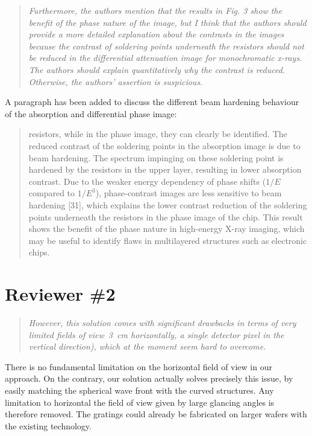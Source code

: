 \documentclass[a4paper,english]{scrartcl}
\newenvironment{reviewerquote}{\begin{quote}\itshape}{\end{quote}}
\begin{document}
\begin{reviewerquote}
    Furthermore, the authors mention that the results in Fig. 3 show the benefit of the phase nature of the image, but I think that the authors should provide a more detailed explanation about the contrasts in the images because the contrast of soldering points underneath the resistors should not be reduced in the differential attenuation image for monochromatic x-rays. The authors should explain quantitatively why the contrast is reduced. Otherwise, the authors' assertion is suspicious.
\end{reviewerquote}
A paragraph has been added to discuss the different beam hardening behaviour of
the absorption and differential phase image:
\begin{quote}
resistors, while in the phase image, they can clearly be identified. The reduced contrast
of the soldering points in the absorption image is due to beam hardening. The spectrum
impinging on these soldering point is hardened by the resistors in the upper layer, resulting
in lower absorption contrast. Due to the weaker energy dependency of phase
shifts ($1/E$
compared to $1/E^3$), phase-contrast images are less sensitive to beam hardening [31], which
explains the lower contrast reduction of the soldering points underneath the resistors in the
phase image of the chip. This result shows the benefit of the phase nature in high-energy
X-ray imaging, which may be useful to identify flaws in multilayered structures such as
electronic chips.
\end{quote}

\section*{Reviewer \#2}
\begin{reviewerquote}
    However, this solution comes with significant drawbacks in terms of very
    limited fields of view~\SI{3}{\centi\metre} horizontally, a single detector pixel in the vertical direction), which at the moment seem hard to overcome.
\end{reviewerquote}
There is no fundamental limitation on the horizontal field of view in our
approach. On the contrary, our solution actually solves precisely this
issue, by easily matching the spherical wave front with the curved
structures. Any limitation to horizontal the field of view given by large glancing
angles is therefore removed. The gratings could already be fabricated on
larger wafers with the existing technology.
\end{document}
